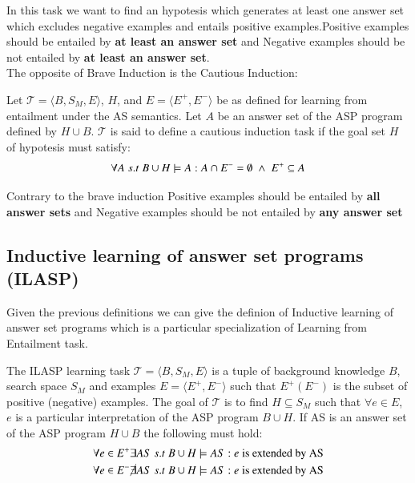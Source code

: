 In this task we want to find an hypotesis which generates at least one answer set which excludes negative 
examples and entails positive examples.Positive examples should be entailed by \textbf{at least an answer set}
and Negative examples should be not entailed by \textbf{at least an answer set}.\\

The opposite of Brave Induction is the Cautious Induction:
\begin{tcolorbox}[colback=red!5!white,colframe=red!75!black,title=\textbf{Definition 7: Cautious induction task}]
    Let $\mathcal{T}=\langle B,S_M, E\rangle$, $H$, and $E=\langle E^+,E^- \rangle$ be as defined for learning from entailment 
    under the AS semantics. Let $A$ be an answer set of the ASP program defined by $H \cup B$.
    $\mathcal{T}$ is said to define a cautious induction task if the goal set $H$ of hypotesis must satisfy:
    \begin{equation*}
        \forall A\;s.t\;B \cup H \models A: A\cap E^- =\emptyset\;\land\;E^+\subseteq A
    \end{equation*}
\end{tcolorbox}

Contrary to the brave induction Positive examples should be entailed by \textbf{all answer sets} and Negative examples should be not entailed by
\textbf{any answer set}

\subsection{Inductive learning of answer set programs (ILASP)}
Given the previous definitions we can give the definion of Inductive learning of answer set programs which is a particular specialization
of Learning from Entailment task.

\begin{tcolorbox}[colback=red!5!white,colframe=red!75!black,title=\textbf{Definition}]
The ILASP learning task $\mathcal{T}=\langle B,S_M, E\rangle$ is a tuple of background knowledge $B$, search space $S_M$ and examples $E=\langle E^+,E^- \rangle$ 
such that $E^+ (E^-)$ is the subset of positive (negative) examples. The goal of $\mathcal{T}$ is to find $H \subseteq S_M$ such that $\forall e\in E$, $e$ is a 
particular interpretation of the ASP program $B\cup H$. If AS is an answer set of the ASP program $H\cup B$ the following must hold:
\begin{align*}
    \forall e \in E^+\exists AS\;s.t\; B\cup H\models AS: e \;\text{is extended by AS}\\
    \forall e \in E^-\cancel{\exists} AS\;s.t\; B\cup H\models AS: e \;\text{is extended by AS}
\end{align*}
\end{tcolorbox}

